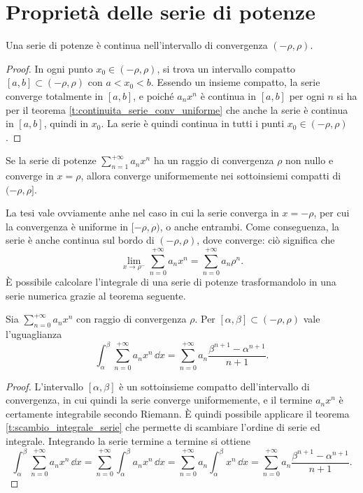 \section{Proprietà delle serie di potenze}
\begin{teorema}
Una serie di potenze è continua nell'intervallo di convergenza $(-\rho,\rho)$.
\end{teorema}
\begin{proof}
In ogni punto $x_0\in(-\rho,\rho)$, si trova un intervallo compatto $[a,b]\subset(-\rho,\rho)$ con $a<x_0<b$. Essendo un insieme compatto, la serie converge totalmente in $[a,b]$, e poiché $a_nx^n$ è continua in $[a,b]$ per ogni $n$ si ha per il teorema \ref{t:continuita_serie_conv_uniforme} che anche la serie è continua in $[a,b]$, quindi in $x_0$.
La serie è quindi continua in tutti i punti $x_0\in(-\rho,\rho)$. 
\end{proof}
\begin{teorema}[di Abel]
Se la serie di potenze $\sum_{n=1}^{+\infty}a_nx^n$ ha un raggio di convergenza $\rho$ non nullo e converge in $x=\rho$, allora converge uniformemente nei sottoinsiemi compatti di $(-\rho,\rho]$.
\end{teorema}
La tesi vale ovviamente anhe nel caso in cui la serie converga in $x=-\rho$, per cui la convergenza è uniforme in $[-\rho,\rho)$, o anche entrambi.
Come conseguenza, la serie è anche continua sul bordo di $(-\rho,\rho)$, dove converge: ciò significa che
\[
\lim_{x\to\rho^-}\sum_{n=0}^{+\infty}a_nx^n=\sum_{n=0}^{+\infty}a_n\rho^n.
\]
È possibile calcolare l'integrale di una serie di potenze trasformandolo in una serie numerica grazie al teorema seguente.
\begin{teorema} \label{t:integrale-serie-potenze}
	Sia $\sum_{n=0}^{+\infty}a_nx^n$ con raggio di convergenza $\rho$.
	Per $[\alpha,\beta]\subset(-\rho,\rho)$ vale l'uguaglianza
	\begin{equation}
		\int_\alpha^\beta\sum_{n=0}^{+\infty}a_nx^n\,\dd x=\sum_{n=0}^{+\infty}a_n\frac{\beta^{n+1}-\alpha^{n+1}}{n+1}.
	\end{equation}
\end{teorema}
\begin{proof}
	L'intervallo $[\alpha,\beta]$ è un sottoinsieme compatto dell'intervallo di convergenza, in cui quindi la serie converge uniformemente, e il termine $a_nx^n$ è certamente integrabile secondo Riemann.
	È quindi possibile applicare il teorema \ref{t:scambio_integrale_serie} che permette di scambiare l'ordine di serie ed integrale.
	Integrando la serie termine a termine si ottiene
	\begin{equation}
		\int_\alpha^\beta\sum_{n=0}^{+\infty}a_nx^n\,\dd x=\sum_{n=0}^{+\infty}\int_\alpha^\beta a_nx^n\,\dd x=\sum_{n=0}^{+\infty}a_n\int_\alpha^\beta x^n\,\dd x=\sum_{n=0}^{+\infty}a_n\frac{\beta^{n+1}-\alpha^{n+1}}{n+1}.
	\end{equation}
\end{proof}

